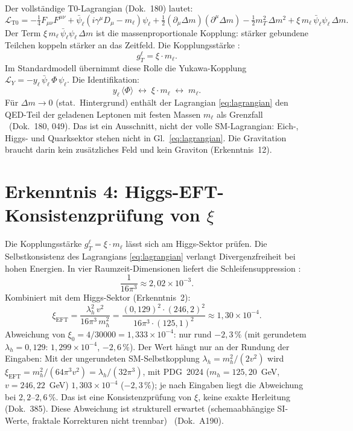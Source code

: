 Der vollständige T0-Lagrangian (Dok.~180) lautet:
\begin{equation}
  \mathcal{L}_{\text{T0}} =
  -\tfrac{1}{4}F_{\mu\nu}F^{\mu\nu}
  + \bar\psi_\ell(i\gamma^\mu D_\mu - m_\ell)\psi_\ell
  + \tfrac{1}{2}(\partial_\mu\Delta m)(\partial^\mu\Delta m)
  - \tfrac{1}{2}m_T^2\,\Delta m^2
  + \xi\,m_\ell\,\bar\psi_\ell\psi_\ell\,\Delta m.
  \label{eq:lagrangian}
\end{equation}
Der Term $\xi\,m_\ell\,\bar\psi_\ell\psi_\ell\,\Delta m$ ist die
massenproportionale Kopplung: stärker gebundene Teilchen koppeln stärker
an das Zeitfeld. Die Kopplungsstärke \BM:
\begin{equation}
  g_T^\ell = \xi\cdot m_\ell.
  \label{eq:coupling}
\end{equation}
Im Standardmodell übernimmt diese Rolle die Yukawa-Kopplung
$\mathcal{L}_Y = -y_\ell\,\bar\psi_\ell\,\Phi\,\psi_\ell$. Die Identifikation:
\begin{equation}
  y_\ell\,\langle\Phi\rangle \;\leftrightarrow\; \xi\cdot m_\ell
  \;\leftrightarrow\; m_\ell.
  \label{eq:yukawa_id}
\end{equation}
Für $\Delta m \to 0$ (stat.\ Hintergrund) enthält der Lagrangian
\eqref{eq:lagrangian} den QED-Teil der geladenen Leptonen mit festen Massen
$m_\ell$ als Grenzfall \BM\ (Dok.~180, 049). Das ist ein Ausschnitt, nicht der
volle SM-Lagrangian: Eich-, Higgs- und Quarksektor stehen nicht in
Gl.~\eqref{eq:lagrangian}. Die Gravitation braucht darin kein zusätzliches Feld
und kein Graviton (Erkenntnis~12).

\section{Erkenntnis 4: Higgs-EFT-Konsistenzprüfung von $\xi$}

Die Kopplungsstärke $g_T^\ell = \xi\cdot m_\ell$ lässt sich am Higgs-Sektor prüfen.
Die Selbstkonsistenz des Lagrangians \eqref{eq:lagrangian} verlangt
Divergenzfreiheit bei hohen Energien. In vier Raumzeit-Dimensionen
liefert die Schleifensuppression \BM:
\begin{equation}
  \frac{1}{16\pi^3} \approx 2{,}02\times10^{-3}.
\end{equation}
Kombiniert mit dem Higgs-Sektor (Erkenntnis~2):
\begin{equation}
  \xi_{\text{EFT}} = \frac{\lambda_h^2\,v^2}{16\pi^3\,m_h^2}
  = \frac{(0{,}129)^2\cdot(246{,}2)^2}{16\pi^3\cdot(125{,}1)^2}
  \approx 1{,}30\times10^{-4}.
  \label{eq:xi_eft}
\end{equation}
Abweichung von $\xi_0 = 4/30000 = 1{,}333\times10^{-4}$: nur rund $-2{,}3\,\%$ (mit gerundetem $\lambda_h = 0{,}129$: $1{,}299\times10^{-4}$, $-2{,}6\,\%$).
Der Wert hängt nur an der Rundung der Eingaben: Mit der ungerundeten
SM-Selbstkopplung $\lambda_h = m_h^2/(2v^2)$ wird
$\xi_{\text{EFT}} = m_h^2/(64\pi^3 v^2) = \lambda_h/(32\pi^3)$, mit PDG~2024
($m_h = 125{,}20$~GeV, $v = 246{,}22$~GeV) $1{,}303\times10^{-4}$ ($-2{,}3\,\%$);
je nach Eingaben liegt die Abweichung bei $2{,}2$--$2{,}6\,\%$. Das ist eine
Konsistenzprüfung von $\xi$, keine exakte Herleitung (Dok.~385).
Diese Abweichung ist strukturell erwartet (schemaabhängige SI-Werte,
fraktale Korrekturen nicht trennbar) \KM\ (Dok.~A190).

